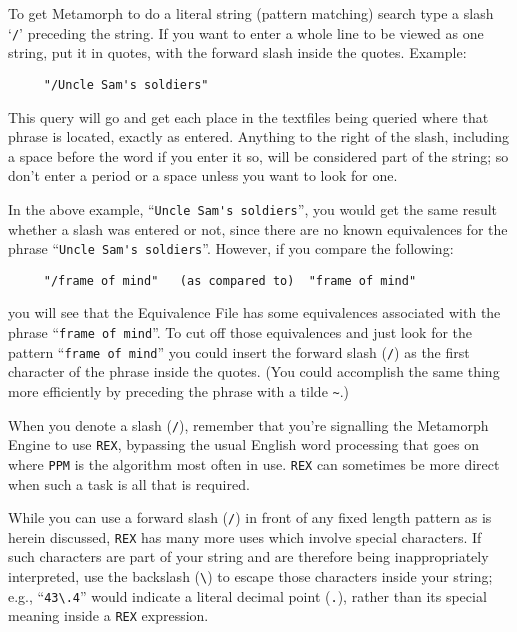 To get Metamorph to do a literal string (pattern matching) search type
a slash `\verb`/`' preceding the string.  If you want to enter a whole
line to be viewed as one string, put it in quotes, with the forward
slash inside the quotes.  Example:

\begin{verbatim}
     "/Uncle Sam's soldiers"
\end{verbatim}

This query will go and get each place in the textfiles being queried
where that phrase is located, exactly as entered.  Anything to the
right of the slash, including a space before the word if you enter it
so, will be considered part of the string; so don't enter a period or
a space unless you want to look for one.

In the above example, ``\verb`Uncle Sam's soldiers`'', you would get
the same result whether a slash was entered or not, since there are no
known equivalences for the phrase ``\verb`Uncle Sam's soldiers`''.
However, if you compare the following:

\begin{verbatim}
     "/frame of mind"   (as compared to)  "frame of mind"
\end{verbatim}

you will see that the Equivalence File has some equivalences
associated with the phrase ``\verb`frame of mind`''.  To cut off those
equivalences and just look for the pattern ``\verb`frame of mind`''
you could insert the forward slash (\verb`/`) as the first character
of the phrase inside the quotes. (You could accomplish the same
thing more efficiently by preceding the phrase with a tilde \verb`~`.)

When you denote a slash (\verb`/`), remember that you're signalling
the Metamorph Engine to use \verb`REX`, bypassing the usual English
word processing that goes on where \verb`PPM` is the algorithm most
often in use.  \verb`REX` can sometimes be more direct when such a
task is all that is required.

While you can use a forward slash (\verb`/`) in front of any fixed
length pattern as is herein discussed, \verb`REX` has many more uses
which involve special characters.  If such characters are part of your
string and are therefore being inappropriately interpreted, use the
backslash (\verb`\`) to escape those characters inside your string;
e.g., ``\verb`43\.4`'' would indicate a literal decimal point
(\verb`.`), rather than its special meaning inside a \verb`REX`
expression.

